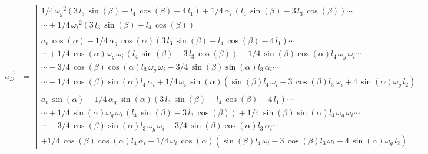 \begin{equation*}
\begin{split}
\overrightarrow{a_{D}}
&=	\begin{bmatrix}
1/4\,{\omega_{g}}^{2} \left( 3\,l_{3}\,\sin\left( \beta \right) +l_{4}\,\cos \left( \beta \right) -4\,l_{1}\right) +1/4\,\alpha_{i}\, \left( l_{4}\,\sin \left( \beta \right) -3\,l_{3}\,\cos \left( \beta \right)  \right)\cdots\\
\cdots +1/4\,{\omega_{i}}^{2}\left( 3\,l_{3}\,\sin \left( \beta \right) +l_{4}\,\cos \left( \beta\right)  \right) \\
\\
%
a_{v}\,\cos \left( \alpha\right) -1/4\,\alpha_{g}\,\cos \left( \alpha \right)  \left( 3\,l_{3}\,\sin \left( \beta \right) +l_{4}\,\cos \left( \beta \right) -4\,l_{1} \right)\cdots\\
\cdots +1/4\,\cos \left( \alpha \right) \omega_{g}\,\omega_{i}\,\left( l_{4}\,\sin \left( \beta \right) -3\,l_{3}\,\cos \left( \beta\right)  \right) +1/4\,\sin \left( \beta \right) \cos \left( \alpha\right) l_{4}\,\omega_{g}\,\omega_{i}\cdots\\
\cdots-3/4\,\cos \left( \beta \right) \cos \left( \alpha \right) l_{3}\,\omega_{g}\,\omega_{i}-3/4\,\sin\left( \beta \right) \sin \left( \alpha \right) l_{3}\,\alpha_{i}\cdots\\
\cdots-1/4\,\cos \left( \beta \right) \sin \left( \alpha \right) l_{4}\,\alpha_{i}+1/4\,\omega_{i}\,\sin \left( \alpha \right)  \left( \sin \left( \beta \right) l_{4}\,\omega_{i}-3\,\cos \left( \beta \right) l_{3}\,\omega_{i}+4\,\sin \left( \alpha \right) \omega_{g}\,l_{2} \right) \\
\\
%
a_{v}\,\sin \left( \alpha \right) -1/4\,\alpha_{g}\,\sin \left( \alpha \right)  \left( 3\,l_{3}\,\sin \left( \beta \right) +l_{4}\,\cos \left( \beta \right) -4\,l_{1} \right)\cdots\\
\cdots +1/4\,\sin \left( \alpha \right) \omega_{g}\,\omega_{i}\, \left( l_{4}\,\sin \left( \beta \right) -3\,l_{3}\,\cos \left( \beta \right) \right) +1/4\,\sin \left( \beta \right) \sin \left( \alpha \right) l_{4}\,\omega_{g}\,\omega_{i}\cdots\\
\cdots-3/4\,\cos \left( \beta \right) \sin\left( \alpha \right) l_{3}\,\omega_{g}\,\omega_{i}+3/4\,\sin \left( \beta \right) \cos \left( \alpha \right) l_{3}\,\alpha_{i}\cdots\\
+1/4\,\cos\left( \beta \right) \cos \left( \alpha \right) l_{4}\,\alpha_{i}-1/4\,\omega_{i}\,\cos \left( \alpha \right)  \left( \sin \left( \beta\right) l_{4}\,\omega_{i}-3\,\cos \left( \beta \right) l_{3}\,\omega_{i}+4\,\sin \left( \alpha \right) \omega_{g}\,l_{2} \right) \
\end{bmatrix}
\end{split}
\end{equation*}